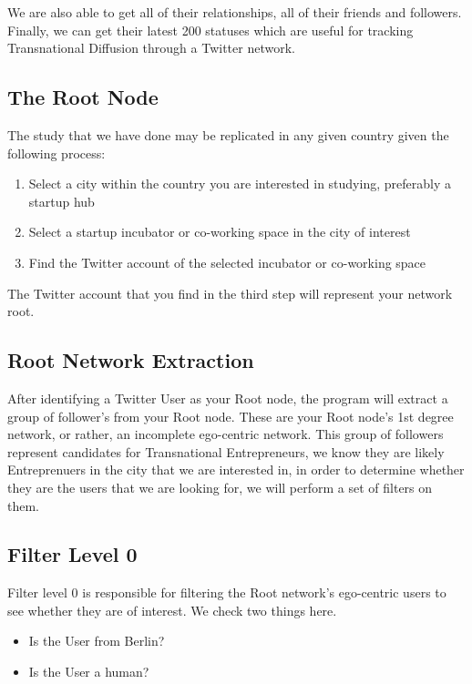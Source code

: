 We are also able to get all of their relationships, all of their friends and followers. Finally, we can get their latest 200 statuses which are useful for tracking Transnational Diffusion through a Twitter network.

\subsection{The Root Node}
The study that we have done may be replicated in any given country given the following process:

\begin{enumerate}
\item Select a city within the country you are interested in studying, preferably a startup hub
\item Select a startup incubator or co-working space in the city of interest
\item Find the Twitter account of the selected incubator or co-working space
\end{enumerate}

The Twitter account that you find in the third step will represent your network root.

\subsection{Root Network Extraction}
After identifying a Twitter User as your Root node, the program will extract a group of follower's from your Root node. These are your Root node's 1st degree network, or rather, an incomplete ego-centric network. This group of followers represent candidates for Transnational Entrepreneurs, we know they are likely Entreprenuers in the city that we are interested in, in order to determine whether they are the users that we are looking for, we will perform a set of filters on them.

\subsection{Filter Level 0}
Filter level 0 is responsible for filtering the Root network's ego-centric users to see whether they are of interest. We check two things here.

\begin{itemize}
\item Is the User from Berlin?
\item Is the User a human?
\end{itemize}

